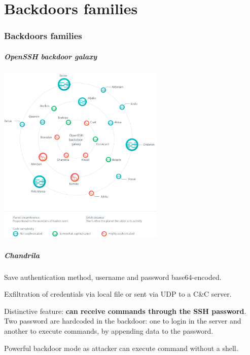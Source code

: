 \part{Backdoors families}
\section{Backdoors families}

\begin{frame}
	\partpage
\end{frame}

\begin{frame}
	\frametitle{OpenSSH backdoor galaxy}
	
   \begin{center}    
   \includegraphics[width=0.6\textwidth]{images/OpenSSH_backdoor_galaxy}
   \end{center}

\end{frame}


\begin{frame}
	\frametitle{Chandrila}
	
	Save authentication method, username and password base64-encoded.
	
	\bigskip
	
	Exfiltration of credentials via local file or sent via UDP to a C\&C server.
	
	\bigskip
	
	Distinctive feature: \textbf{can receive commands through the SSH password}.\\
	Two password are hardcoded in the backdoor: one to login in the server and another to execute commands, by appending data to the password.
	
	\bigskip

  Powerful backdoor mode as attacker can execute command without a shell.
  
\end{frame}


